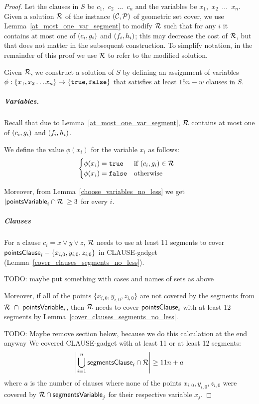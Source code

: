 \begin{proof}\leavevmode
Let the clauses in $S$ be $c_1$,~$c_2$~$\ldots$~$c_n$
and the variables be $x_1$,~$x_2$~$\ldots$~$x_n$.
Given a solution $\mathcal{R}$
of the instance $(\mathcal{C}, \mathcal{P})$ of geometric set cover, we use Lemma~\ref{at_most_one_var_segment} to modify $\mathcal{R}$ such that for any $i$ it contains at most one of $(c_{i}, g_{i})$ and $(f_{i}, h_{i})$; this may decrease the cost of $\mathcal{R}$, but that does not matter in the subsequent construction. To simplify notation, in the remainder of this proof we use $\mathcal{R}$ to refer to the modified solution.

Given $\mathcal{R}$, we construct a solution of $S$ by defining an
assignment of variables 
$\phi : \{ x_1, x_2 \ldots x_n\} \rightarrow \{\texttt{true}, \texttt{false}\}$
that satisfies at least $15n-w$ clauses in $S$.

\subparagraph{Variables.}
Recall that due to Lemma~\ref{at_most_one_var_segment}, $\mathcal{R}$ contains at most one of $(c_{i}, g_{i})$ and $(f_{i}, h_{i})$.

We define the value $\phi(x_i)$ for the variable $x_i$ as follows:
\begin{align}
	\begin{split}
	\label{eqn:variable_assignment}
	& \begin{cases}
	\phi(x_i) = \texttt{true} & \text{if}\ (c_{i}, g_{i}) \in \mathcal{R} \\
	\phi(x_i) = \texttt{false} & \text{otherwise}
	\end{cases}
	\end{split}
\end{align}

Moreover, from Lemma~\ref{choose_variables_no_less} we get $|\mathsf{pointsVariable}_{i} \cap \mathcal{R}| \ge 3$ for every $i$.

\subparagraph{Clauses}

For a clause $c_i = x \lor y \lor z$,
$\mathcal{R}$ needs to use at least 11 segments to cover $\mathsf{pointsClause}_i - \{x_{i,0}, y_{i,0}, z_{i,0}\}$
in CLAUSE-gadget (Lemma~\ref{cover_clauses_segments_no_less}).

TODO: maybe put something with cases and names of sets as above

Moreover, if all of the points $\{x_{i,0}, y_{i,0}, z_{i,0}\}$
are not covered by the segments from $\mathcal{R}~\cap~\mathsf{pointsVariable}_{i}$,
then $\mathcal{R}$ needs to cover $\mathsf{pointsClause}_i$
with at least 12 segments
by Lemma~\ref{cover_clauses_segments_no_less}.


TODO: Maybe remove section below, because we do this calculation at the end anyway
We covered CLAUSE-gadget with at least 11 or at least 12 segments:
$$\left|\bigcup\limits_{i=1}^n \mathsf{segmentsClause}_i \cap \mathcal{R}\right| \ge 11n + a$$
where $a$ is the number of clauses
where none of the points $x_{i,0}, y_{i,0}, z_{i,0}$
were covered by $\mathcal{R} \cap \mathsf{segmentsVariable}_{j}$ for their respective
variable $x_j$.


\end{proof}
